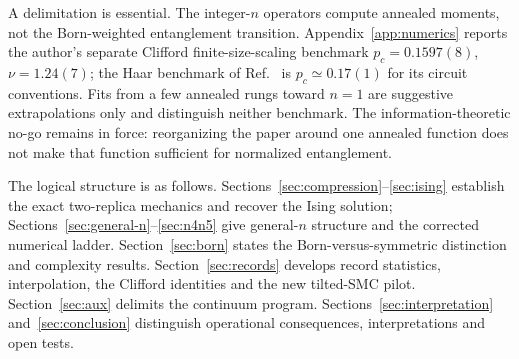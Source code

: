 A delimitation is essential. The integer-$n$ operators compute annealed moments, not the Born-weighted entanglement transition. Appendix~\ref{app:numerics} reports the author's separate Clifford finite-size-scaling benchmark $p_c=0.1597(8)$, $\nu=1.24(7)$; the Haar benchmark of Ref.~\cite{Zabalo2020} is $p_c\simeq0.17(1)$ for its circuit conventions. Fits from a few annealed rungs toward $n=1$ are suggestive extrapolations only and distinguish neither benchmark. The information-theoretic no-go remains in force: reorganizing the paper around one annealed function does not make that function sufficient for normalized entanglement.

The logical structure is as follows. Sections~\ref{sec:compression}--\ref{sec:ising} establish the exact two-replica mechanics and recover the Ising solution; Sections~\ref{sec:general-n}--\ref{sec:n4n5} give general-$n$ structure and the corrected numerical ladder. Section~\ref{sec:born} states the Born-versus-symmetric distinction and complexity results. Section~\ref{sec:records} develops record statistics, interpolation, the Clifford identities and the new tilted-SMC pilot. Section~\ref{sec:aux} delimits the continuum program. Sections~\ref{sec:interpretation} and~\ref{sec:conclusion} distinguish operational consequences, interpretations and open tests.
